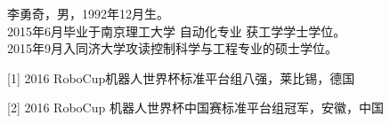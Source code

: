 \begin{resume}

\hskip-0.81cm 李勇奇，男，1992年12月生。
\\
2015年6月毕业于南京理工大学 自动化专业 获工学学士学位。
\\
2015年9月入同济大学攻读控制科学与工程专业的硕士学位。



\hskip-0.81cm [1] 2016 RoboCup机器人世界杯标准平台组八强，莱比锡，德国

\hskip-0.81cm [2] 2016 RoboCup 机器人世界杯中国赛标准平台组冠军，安徽，中国


\end{resume}

